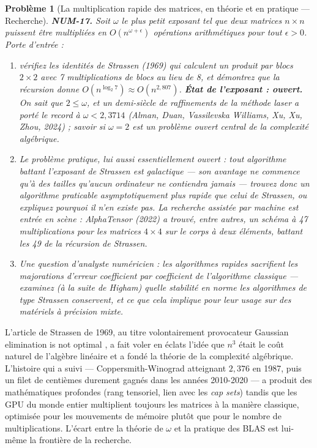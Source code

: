 \documentclass[11pt]{article}
\newtheorem{problem}{Problème}
\begin{document}
\begin{problem}[{La multiplication rapide des matrices, en théorie et en pratique --- Recherche}]
\textbf{NUM-17.} Soit $\omega$ le plus petit exposant tel
que deux matrices $n \times n$ puissent être multipliées en $O(n^{\omega + \epsilon})$
opérations arithmétiques pour tout $\epsilon > 0$. Porte d'entrée :
\begin{enumerate}
\item[(a)] vérifiez
les identités de Strassen (1969) qui calculent un produit par blocs $2 \times 2$ avec
7 multiplications de blocs au lieu de 8, et démontrez que la récursion donne
$O(n^{\log_2 7}) \approx O(n^{2{,}807})$. \textbf{État de l'exposant : ouvert.}
On sait que $2 \le \omega$, et un demi-siècle de raffinements de la \og{} méthode laser \fg{}
a porté le record à $\omega < 2{,}3714$ (Alman, Duan,
Vassilevska Williams, Xu, Xu, Zhou, 2024) ; savoir si $\omega = 2$ est un problème
ouvert central de la complexité algébrique.
\item[(b)] Le problème \textit{pratique}, lui aussi
essentiellement ouvert : tout algorithme battant l'exposant de Strassen est
\og{} galactique \fg{} --- son avantage ne commence qu'à des tailles qu'aucun ordinateur ne
contiendra jamais --- trouvez donc un algorithme praticable asymptotiquement plus rapide
que celui de Strassen, ou expliquez pourquoi il n'en existe pas. La recherche assistée
par machine est entrée en scène : AlphaTensor (2022) a trouvé, entre autres, un schéma
à 47 multiplications pour les matrices $4 \times 4$ sur le corps à deux
éléments, battant les 49 de la récursion de Strassen.
\item[(c)] Une question d'analyste numéricien :
les algorithmes rapides sacrifient les majorations d'erreur coefficient par coefficient
de l'algorithme classique --- examinez (à la suite de Higham) quelle stabilité en norme
les algorithmes de type Strassen conservent, et ce que cela implique pour leur usage sur
des matériels à précision mixte.
\end{enumerate}

\end{problem}

\noindent L'article de Strassen de 1969, au titre volontairement provocateur
\og{} Gaussian elimination is not optimal \fg{}, a fait voler en éclats l'idée que $n^3$ était
le coût naturel de l'algèbre linéaire et a fondé la théorie de la complexité algébrique.
L'histoire qui a suivi --- Coppersmith-Winograd atteignant $2{,}376$ en 1987, puis un
filet de centièmes durement gagnés dans les années 2010-2020 --- a produit des
mathématiques profondes (rang tensoriel, lien avec les \textit{cap sets}) tandis que les
GPU du monde entier multiplient toujours les matrices à la manière classique, optimisée
pour les mouvements de mémoire plutôt que pour le nombre de multiplications. L'écart
entre la théorie de $\omega$ et la pratique des BLAS est lui-même la frontière de la
recherche.
\end{document}
